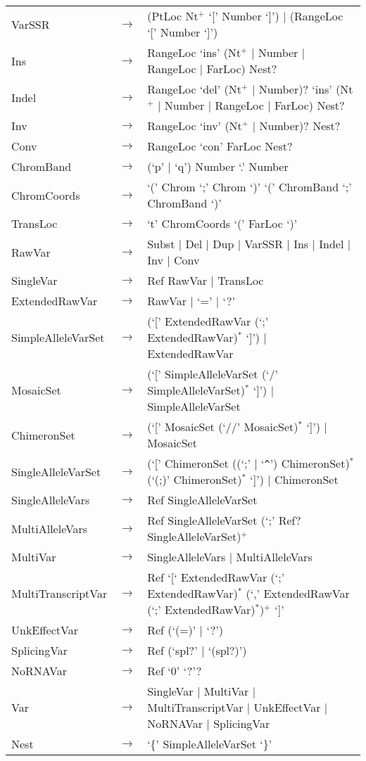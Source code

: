 \begin{longtable}{llp{7cm}}
VarSSR & $\rightarrow$ & (PtLoc  Nt$^+$ `[' Number `]') $|$ (RangeLoc `[' Number `]') \\
Ins & $\rightarrow$ & RangeLoc `ins' (Nt$^+$ $|$ Number $|$ RangeLoc $|$ FarLoc) Nest?\\
Indel & $\rightarrow$ & RangeLoc `del' (Nt$^+$ $|$ Number)? `ins' (Nt$^+$ $|$ Number $|$ RangeLoc $|$ FarLoc) Nest?\\
Inv & $\rightarrow$ & RangeLoc `inv' (Nt$^+$ $|$ Number)? Nest?\\
Conv & $\rightarrow$ & RangeLoc `con' FarLoc Nest?\\
ChromBand & $\rightarrow$ & (`p' $|$ `q') Number `.' Number\\
ChromCoords & $\rightarrow$ & `(' Chrom `;' Chrom `)' `(' ChromBand `;' ChromBand `)'\\
TransLoc & $\rightarrow$ & `t' ChromCoords `(' FarLoc `)'\\
RawVar & $\rightarrow$ & Subst $|$ Del $|$ Dup $|$ VarSSR $|$ Ins $|$ Indel $|$ Inv $|$ Conv\\
SingleVar & $\rightarrow$ & Ref RawVar $|$ TransLoc\\
ExtendedRawVar & $\rightarrow$ & RawVar $|$ `=' $|$ `?'\\
SimpleAlleleVarSet & $\rightarrow$ & (`[' ExtendedRawVar (`;' ExtendedRawVar)$^*$ `]') $|$ ExtendedRawVar\\ 
MosaicSet & $\rightarrow$ & (`[' SimpleAlleleVarSet (`/' SimpleAlleleVarSet)$^*$ `]') $|$ SimpleAlleleVarSet\\
ChimeronSet & $\rightarrow$ & (`[' MosaicSet (`//' MosaicSet)$^*$ `]') $|$ MosaicSet\\
SingleAlleleVarSet & $\rightarrow$ & (`[' ChimeronSet ((`;' $|$ `\verb#^#') ChimeronSet)$^*$ (`(;)' ChimeronSet)$^*$ `]') $|$ ChimeronSet\\
SingleAlleleVars & $\rightarrow$ & Ref SingleAlleleVarSet\\
MultiAlleleVars & $\rightarrow$ & Ref SingleAlleleVarSet (`;' Ref? SingleAlleleVarSet)$^+$\\
MultiVar & $\rightarrow$ & SingleAlleleVars $|$ MultiAlleleVars\\
MultiTranscriptVar & $\rightarrow$ & Ref `[` ExtendedRawVar (`;' ExtendedRawVar)$^*$ (`,' ExtendedRawVar (`;' ExtendedRawVar)$^*$)$^+$ `]'\\
UnkEffectVar & $\rightarrow$ & Ref (`(=)' $|$ `?')\\
SplicingVar & $\rightarrow$ & Ref (`spl?' $|$ `(spl?)')\\
NoRNAVar & $\rightarrow$ & Ref `0' `?'?\\
Var & $\rightarrow$ & SingleVar $|$ MultiVar $|$ MultiTranscriptVar $|$ UnkEffectVar $|$ NoRNAVar $|$ SplicingVar\\
Nest & $\rightarrow$ & `\{' SimpleAlleleVarSet `\}'
\end{longtable}
